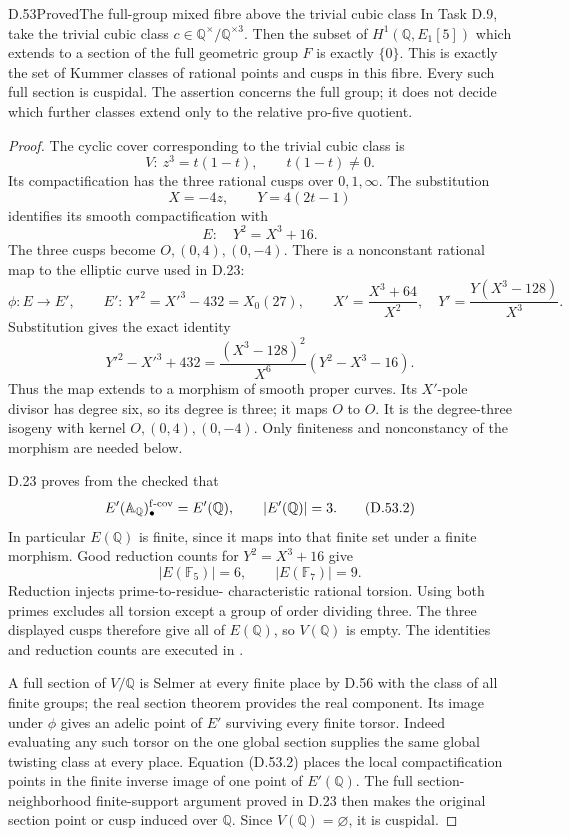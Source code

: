 \begin{statement}{D.53}{Proved}{The full-group mixed fibre above the trivial cubic class}
In Task D.9, take the trivial cubic class
\(c\in\mathbb Q^\times/\mathbb Q^{\times3}\).
Then the subset of
\(H^1(\mathbb Q,E_1[5])\) which extends to
a section of the full geometric group
\(F\) is exactly \(\{0\}\). This is
exactly the set of Kummer classes of
rational points and cusps in this fibre.
Every such full section is cuspidal.
The assertion concerns the full group;
it does not decide which further classes
extend only to the relative pro-five
quotient.
\end{statement}
\begin{proof}
The cyclic cover corresponding to the
trivial cubic class is
\[
 V:\ z^3=t(1-t),\qquad t(1-t)\ne0 .
\]
Its compactification has the three
rational cusps over \(0,1,\infty\).
The substitution
\[
       X=-4z,\qquad Y=4(2t-1)
\]
identifies its smooth compactification
with
\[
             E:\quad Y^2=X^3+16.
\]
The three cusps become
\(O,(0,4),(0,-4)\).
There is a nonconstant rational map
to the elliptic curve used in D.23:
\[
 \phi:E\longrightarrow E',\qquad
 E':\ Y'^2=X'^3-432=X_0(27),
 \qquad
 X'=\frac{X^3+64}{X^2},\quad
 Y'=\frac{Y(X^3-128)}{X^3}.                         \tag{D.53.1}
\]
Substitution gives the exact identity
\[
 Y'^2-X'^3+432
 =\frac{(X^3-128)^2}{X^6}(Y^2-X^3-16).
\]
Thus the map extends to a morphism of
smooth proper curves. Its \(X'\)-pole
divisor has degree six, so its degree
is three; it maps \(O\) to \(O\).
It is the degree-three isogeny with
kernel \(O,(0,4),(0,-4)\).
Only finiteness and nonconstancy of
the morphism are needed below.

D.23 proves from the checked
\cite[Corollary 8.8]{DE_Stoll2007} that
\[
 E'(\mathbb A_{\mathbb Q})_\bullet^{\rm f\text{-}cov}
       =E'(\mathbb Q),
 \qquad |E'(\mathbb Q)|=3.                         \tag{D.53.2}
\]
In particular \(E(\mathbb Q)\) is finite,
since it maps into that finite set
under a finite morphism. Good reduction
counts for \(Y^2=X^3+16\) give
\[
                |E(\mathbb F_5)|=6,\qquad
                |E(\mathbb F_7)|=9.
\]
Reduction injects prime-to-residue-
characteristic rational torsion. Using
both primes excludes all torsion except
a group of order dividing three. The
three displayed cusps therefore give
all of \(E(\mathbb Q)\), so \(V(\mathbb Q)\)
is empty. The identities and reduction
counts are executed in
.

A full section of \(V/\mathbb Q\) is
Selmer at every finite place by D.56
with the class of all finite groups;
the real section theorem provides
the real component. Its image under
\(\phi\) gives an adelic point of \(E'\)
surviving every finite torsor. Indeed
evaluating any such torsor on the
one global section supplies the same
global twisting class at every place.
Equation (D.53.2) places the local
compactification points in the finite
inverse image of one point of
\(E'(\mathbb Q)\). The full
section-neighborhood finite-support
argument proved in D.23 then makes
the original section point or cusp
induced over \(\mathbb Q\). Since
\(V(\mathbb Q)=\varnothing\), it is
cuspidal.


\end{proof}
